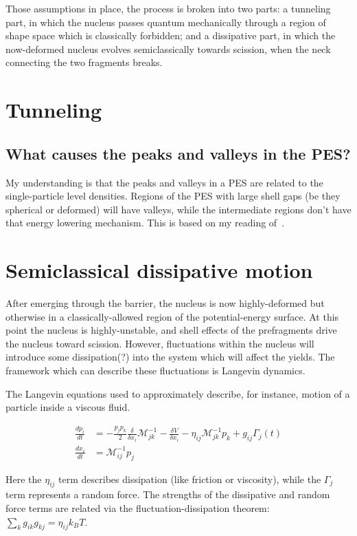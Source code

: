 Those assumptions in place, the process is broken into two parts: a tunneling part, in which the nucleus passes quantum mechanically through a region of shape space which is classically forbidden; and a dissipative part, in which the now-deformed nucleus evolves semiclassically towards scission, when the neck connecting the two fragments breaks.

\section{Tunneling}
\subsection{What causes the peaks and valleys in the PES?}
My understanding is that the peaks and valleys in a PES are related to the single-particle level densities. Regions of the PES with large shell gaps (be they spherical or deformed) will have valleys, while the intermediate regions don't have that energy lowering mechanism. This is based on my reading of~\cite{warda2012}.

\section{Semiclassical dissipative motion}
After emerging through the barrier, the nucleus is now highly-deformed but otherwise in a classically-allowed region of the potential-energy surface. At this point the nucleus is highly-unstable, and shell effects of the prefragments drive the nucleus toward scission. However, fluctuations within the nucleus will introduce some dissipation(?) into the system which will affect the yields. The framework which can describe these fluctuations is Langevin dynamics.

The Langevin equations used to approximately describe, for instance, motion of a particle inside a viscous fluid.

\begin{align}
\frac{dp_i}{dt} &= -\frac{p_jp_k}{2}\frac{\delta}{\delta x_i}\mathcal{M}^{-1}_{jk} - \frac{\delta V}{\delta x_i} - \eta_{ij}\mathcal{M}^{-1}_{jk}p_k + g_{ij}\Gamma_j(t) \\
\frac{dx_i}{dt} &= \mathcal{M}^{-1}_{ij}p_j
\end{align}

\noindent Here the $\eta_{ij}$ term describes dissipation (like friction or viscosity), while the $\Gamma_j$ term represents a random force. The strengths of the dissipative and random force terms are related via the fluctuation-dissipation theorem: $\sum_k g_{ik}g_{kj} = \eta_{ij}k_B T$.

